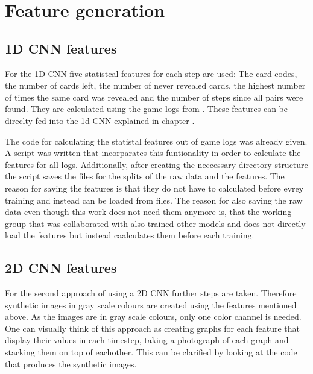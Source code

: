 \section{Feature generation}
\label{feature_generation}

\subsection{1D CNN features}
\label{1d_cnn_features}
For the 1D CNN five statistcal features for each step are used: The card codes, the number of cards left, the number of never revealed cards,  the highest number of times the same card was revealed and the number of steps  since all pairs were found. They are calculated using the game logs from . These features can be direclty fed into the 1d CNN explained in chapter . 

The code for calculating the statistal features out of game logs was already given. A script was written that incorparates this funtionality in order to calculate the features for all logs. Additionally, after creating the neccessary directory structure the script saves the files for the splits of the raw data and the features. The reason for saving the features is that they do not have to calculated before evrey training and instead can be loaded from files. The reason for also saving the raw data even though this work does not need them anymore is, that the working group that was collaborated with also trained other models and does not directly load the features but instead caalculates them before each training.

\subsection{2D CNN features}
\label{2d_cnn_features}

For the second approach of using a 2D CNN further steps are taken. Therefore synthetic images in gray scale colours are created using the features mentioned above. As the images are in gray scale colours, only one color channel is needed. One can visually think of this approach as creating graphs for each feature that display their values in each timestep, taking a photograph of each graph and stacking them on top of eachother. This can be clarified by looking at the code that produces the synthetic images.  


